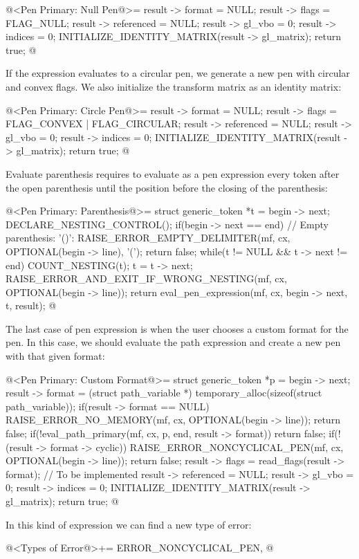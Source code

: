 {{{{{\iniciocodigo
@<Pen Primary: Null Pen@>=
result -> format = NULL;
result -> flags = FLAG_NULL;
result -> referenced = NULL;
result -> gl_vbo = 0;
result -> indices = 0;
INITIALIZE_IDENTITY_MATRIX(result -> gl_matrix);
return true;
@
\fimcodigo

If the expression evaluates to a circular pen, we generate a new pen
with circular and convex flags. We also initialize the transform
matrix as an identity matrix:

\iniciocodigo
@<Pen Primary: Circle Pen@>=
result -> format = NULL;
result -> flags = FLAG_CONVEX | FLAG_CIRCULAR;
result -> referenced = NULL;
result -> gl_vbo = 0;
result -> indices = 0;
INITIALIZE_IDENTITY_MATRIX(result -> gl_matrix);
return true;
@
\fimcodigo

Evaluate parenthesis requires to evaluate as a pen expression every
token after the open parenthesis until the position before the closing
of the parenthesis:

\iniciocodigo
@<Pen Primary: Parenthesis@>=
struct generic_token *t = begin -> next;
DECLARE_NESTING_CONTROL();
if(begin -> next == end){ // Empty parenthesis: '()':
  RAISE_ERROR_EMPTY_DELIMITER(mf, cx, OPTIONAL(begin -> line), '(');
  return false;
}
while(t != NULL && t -> next != end){
  COUNT_NESTING(t);
  t = t -> next;
}
RAISE_ERROR_AND_EXIT_IF_WRONG_NESTING(mf, cx, OPTIONAL(begin -> line));
return eval_pen_expression(mf, cx, begin -> next, t, result);
@
\fimcodigo

The last case of pen expression is when the user chooses a custom
format for the pen. In this case, we should evaluate the path
expression and create a new pen with that given format:

\iniciocodigo
@<Pen Primary: Custom Format@>=
struct generic_token *p = begin -> next;
result -> format =
        (struct path_variable *) temporary_alloc(sizeof(struct path_variable));
if(result -> format == NULL){
  RAISE_ERROR_NO_MEMORY(mf, cx, OPTIONAL(begin -> line));
  return false;
}
if(!eval_path_primary(mf, cx, p, end, result -> format))
  return false;
if(!(result -> format -> cyclic)){
  RAISE_ERROR_NONCYCLICAL_PEN(mf, cx, OPTIONAL(begin -> line));
  return false;
}
result -> flags = read_flags(result -> format); // To be implemented
result -> referenced = NULL;
result -> gl_vbo = 0;
result -> indices = 0;
INITIALIZE_IDENTITY_MATRIX(result -> gl_matrix);
return true;
@
\fimcodigo

In this kind of expression we can find a new type of error:

\iniciocodigo
@<Types of Error@>+=
ERROR_NONCYCLICAL_PEN,
@
\fimcodigo

}}}}}
